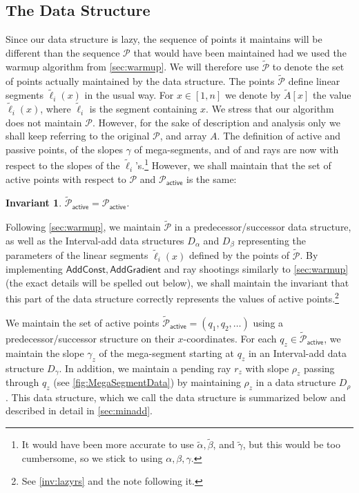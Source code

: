 \documentclass[10pt,a4paper]{article}
\newcommand{\AC}{\mathsf{AddConst}}
\newcommand{\AG}{\mathsf{AddGradient}}
\newcommand{\local}{\text{short }}
\newcommand{\longrange}{\text{long }}
\newcommand{\addmin}{\text{Add-min }}
\renewcommand{\P}{\mathcal{P}}
\newcommand{\AP}{\P_{\mathsf{active}}}
\newcommand{\TAP}{\tilde{\P}_{\mathsf{active}}}
\newcommand{\TA}{\tilde{A}}
\newcommand{\tell}{\tilde{\ell}}
\newcommand{\TP}{\tilde{\P}}
\newcommand{\ray}{r}
\newcommand{\rl}[1]{\rho_{#1}}
\newtheorem{invariant}{Invariant}
\begin{document}
\subsection{The Data Structure}
Since our data structure is lazy, the sequence of points it maintains will be different than the sequence $\P$ that would have been maintained had we used the warmup algorithm from \cref{sec:warmup}. We will therefore use $\TP$ to denote the set of points actually maintained by the data structure. The points $\TP$ define linear segments $\tell_i(x)$ in the usual way. For $x \in [1,n]$ we denote by $\TA[x]$ the value $\tell_i(x)$, where $\tell_i$ is the segment containing $x$.
We stress that our algorithm does not maintain $\P$. However, for the sake of description and analysis only we shall keep referring to the original $\P$, and array $A$.
The definition of active and passive points, of the slopes $\gamma$ of mega-segments, and of \local and \longrange rays are now with respect to the slopes of the $\tell_i$'s.\footnote{It would have been more accurate to use $\tilde \alpha, \tilde \beta$, and $\tilde \gamma$, but this would be too cumbersome, so we stick to using $\alpha, \beta, \gamma$.} 
However, we shall maintain that the set of active points with respect to $\P$ and $\AP$ is the same:
\begin{invariant}\label{inv:TAP-AP}
$\TAP = \AP$.	
\end{invariant}

Following \cref{sec:warmup}, we maintain $\TP$ in a predecessor/successor data structure, as well as the Interval-add data structures $D_\alpha$ and $D_\beta$ representing the parameters of the linear segments $\tell_i(x)$ defined by the points of $\TP$. 
By implementing $\AC, \AG$ and \longrange ray shootings similarly to \cref{sec:warmup} (the exact details will be spelled out below),  we shall maintain the invariant that this part of the data structure correctly represents the values of active points.\footnote{See  \cref{inv:lazyrs} and the note following it.}  

We maintain the set of active points $\TAP=(q_1, q_2, \ldots)$ using a predecessor/successor structure on their $x$-coordinates. 
For each $q_z \in \TAP$, we maintain the slope $\gamma_z$ of the mega-segment starting at $q_z$ in an Interval-add data structure $D_\gamma$. In addition, we maintain a pending \local ray $\ray_z$ with slope $\rl{z}$ passing through $q_z$ (see \cref{fig:MegaSegmentData}) by maintaining $\rl{z}$ in a data structure $D_\rho$. This data structure, which we call the \addmin data structure is summarized below and described in detail in \cref{sec:minadd}. 
\end{document}
